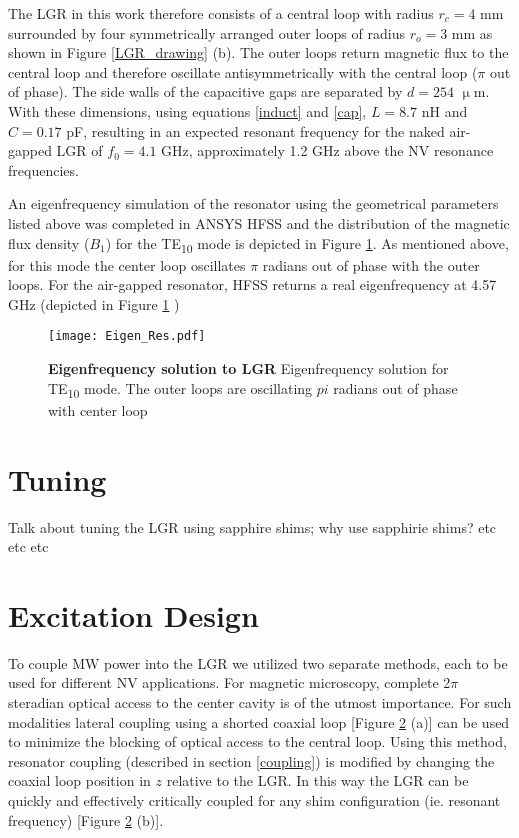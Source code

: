 The LGR in this work therefore consists of a central loop with radius $r_c = 4$ mm surrounded by four symmetrically arranged outer loops of radius $r_o = 3$ mm as shown in Figure \ref{LGR_drawing} (b). The outer loops return magnetic flux to the central loop and therefore oscillate antisymmetrically with the central loop ($\pi$ out of phase). The side walls of the capacitive gaps are separated by $d = 254$ $\upmu$m. With these dimensions, using equations \ref{induct} and \ref{cap}, $L = 8.7$ nH and $C = 0.17$ pF, resulting in an expected resonant frequency for the naked air-gapped LGR of $f_0 = 4.1$ GHz, approximately 1.2 GHz above the NV resonance frequencies.

An eigenfrequency simulation of the resonator using the geometrical parameters listed above was completed in ANSYS HFSS and the distribution of the magnetic flux density ($B_1$) for the TE\textsubscript{10} mode is depicted in Figure \ref{LGR_Eigen}. As mentioned above, for this mode the center loop oscillates $\pi$ radians out of phase with the outer loops. For the air-gapped resonator, HFSS returns a real eigenfrequency at 4.57 GHz (depicted in Figure \ref{LGR_Eigen} ) 

\begin{figure}[h!]
\centering
\texttt{[image: Eigen\_Res.pdf]}  
\caption{\textbf{Eigenfrequency solution to LGR} Eigenfrequency solution for TE\textsubscript{10} mode. The outer loops are oscillating $pi$ radians out of phase with center loop}
\label{LGR_Eigen}
\end{figure}


\section{Tuning} \label{tuning}

Talk about tuning the LGR using sapphire shims; why use sapphirie shims? etc etc etc

\section{Excitation Design}

To couple MW power into the LGR we utilized two separate methods, each to be used for different NV applications. For magnetic  microscopy, complete 2$\pi$ steradian optical access to the center cavity is of the utmost importance. For such modalities lateral coupling using a shorted coaxial loop [Figure \ref{} (a)] can be used to minimize the blocking of optical access to the central loop. Using this method, resonator coupling (described in section \ref{coupling}) is modified by changing the coaxial loop position in $z$ relative to the LGR. In this way the LGR can be quickly and effectively critically coupled for any shim configuration (ie. resonant frequency) [Figure \ref{} (b)].  



